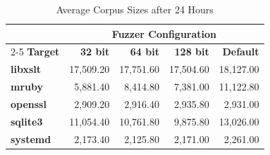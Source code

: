\begin{table}[htbp]
\centering
\begin{tabular}{lrrrr}
\toprule
& \multicolumn{4}{c}{\textbf{Fuzzer Configuration}} \\
\cmidrule(l){2-5}
\textbf{Target} & \textbf{32 bit} & \textbf{64 bit} & \textbf{128 bit} & \textbf{Default} \\
\midrule
\textbf{libxslt} & 17,509.20 & 17,751.60 & 17,504.60 & 18,127.00 \\
\textbf{mruby}   & 5,881.40  & 8,414.80  & 7,381.00  & 11,122.80 \\
\textbf{openssl} & 2,909.20  & 2,916.40  & 2,935.80  & 2,931.00 \\
\textbf{sqlite3} & 11,054.40 & 10,761.80 & 9,875.80  & 13,026.00 \\
\textbf{systemd} & 2,173.40  & 2,125.80  & 2,171.00  & 2,261.00 \\
\bottomrule
\end{tabular}
\caption{Average Corpus Sizes after 24 Hours}
\label{tab:corpus_sizes}
\end{table}